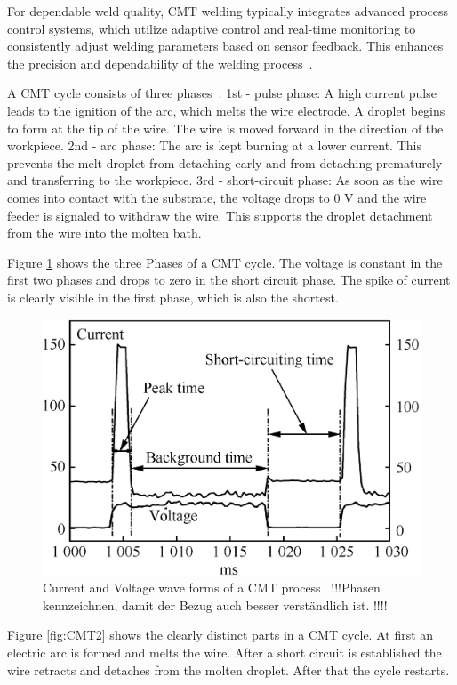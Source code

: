 For dependable weld quality, CMT welding typically integrates advanced process control systems, which utilize adaptive control and real-time monitoring to consistently adjust welding parameters based on sensor feedback. This enhances the precision and dependability of the welding process~\cite{Pickin.2006}.

A CMT cycle consists of three phases~\cite{Selvi.2018}:\newline
1st - pulse phase: A high current pulse leads to the ignition of the arc, 
which melts the wire electrode. A droplet begins to form at the 
tip of the wire. The wire is moved forward in the direction of the 
workpiece.\newline
2nd - arc phase: The arc is kept burning at a lower current. This prevents the melt droplet from detaching early and 
from detaching prematurely and transferring to the workpiece.\newline
3rd - short-circuit phase: As soon as the wire comes into contact with the substrate, 
the voltage drops to 0 V and the wire feeder is signaled to withdraw the wire. This supports the droplet detachment 
from the wire into the molten bath.

Figure \ref{fig:CMT} shows the three Phases of a CMT cycle. The voltage is constant in the first two phases and drops to zero in the short circuit phase. The spike of current is clearly visible in the first phase, which is also the shortest.

\begin{figure}[H]
	\centering
	\includegraphics[width=0.6\linewidth]{figures/CMT.jpg}
	\caption{Current and Voltage wave forms of a CMT process~\cite{Selvi.2018} !!!Phasen kennzeichnen, damit der Bezug auch besser verständlich ist. !!!!}
	\label{fig:CMT}
\end{figure}


Figure \ref{fig:CMT2} shows the clearly distinct parts in a CMT cycle. At first an electric arc is formed and melts the wire. After a short circuit is established the wire retracts and detaches from the molten droplet. After that the cycle restarts.

